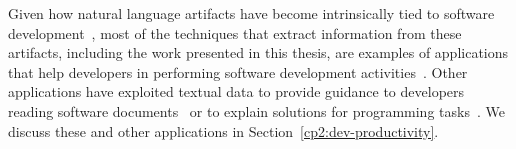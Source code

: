 Given how 
natural language artifacts have become intrinsically
tied to software development~\cite{liu2021, watson2022, umarji2008archetypal},
most of the techniques that extract information from these artifacts, including the work presented in this thesis, 
are examples of applications that help developers in performing 
software development activities~\cite{Meyer2017}. 
Other applications have exploited textual data
to provide guidance to developers reading software documents~\cite{Treude2016,  robillard2017} 
or  to  explain solutions for programming tasks~\cite{silva2019}.
We discuss these and other applications in Section~\ref{cp2:dev-productivity}.








